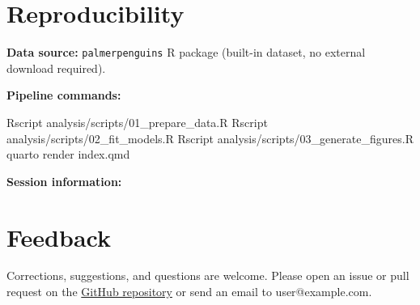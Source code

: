\documentclass[
  letterpaper,
  DIV=11,
  numbers=noendperiod]{scrartcl}
\newenvironment{Shaded}{\begin{snugshade}}{\end{snugshade}}
\newcommand{\ExtensionTok}[1]{\textcolor[rgb]{0.00,0.23,0.31}{#1}}
\newcommand{\NormalTok}[1]{\textcolor[rgb]{0.00,0.23,0.31}{#1}}
\begin{document}
\section{Reproducibility}\label{reproducibility}

\textbf{Data source:} \texttt{palmerpenguins} R package (built-in
dataset, no external download required).

\textbf{Pipeline commands:}

\begin{Shaded}
\begin{Highlighting}[]
\ExtensionTok{Rscript}\NormalTok{ analysis/scripts/01\_prepare\_data.R}
\ExtensionTok{Rscript}\NormalTok{ analysis/scripts/02\_fit\_models.R}
\ExtensionTok{Rscript}\NormalTok{ analysis/scripts/03\_generate\_figures.R}
\ExtensionTok{quarto}\NormalTok{ render index.qmd}
\end{Highlighting}
\end{Shaded}

\textbf{Session information:}

\section{Feedback}\label{feedback}

Corrections, suggestions, and questions are welcome. Please open an
issue or pull request on the \href{https://github.com/mygit}{GitHub
repository} or send an email to user@example.com.
\end{document}
